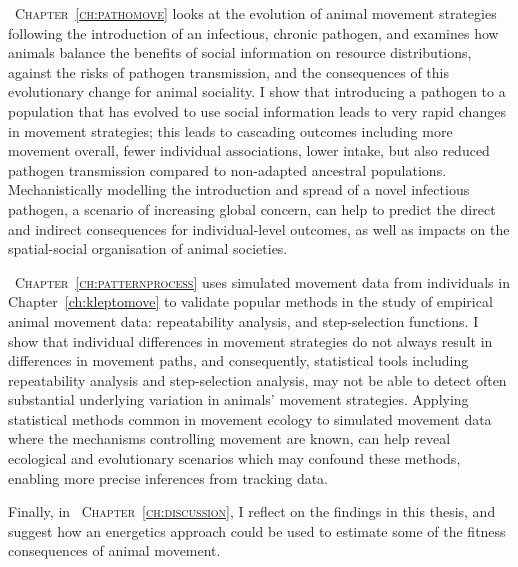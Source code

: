 \medskip

{\scshape~Chapter~\ref{ch:pathomove}} looks at the evolution of animal movement strategies following the introduction of an infectious, chronic pathogen, and examines how animals balance the benefits of social information on resource distributions, against the risks of pathogen transmission, and the consequences of this evolutionary change for animal sociality.
I show that introducing a pathogen to a population that has evolved to use social information leads to very rapid changes in movement strategies; this leads to cascading outcomes including more movement overall, fewer individual associations, lower intake, but also reduced pathogen transmission compared to non-adapted ancestral populations.
Mechanistically modelling the introduction and spread of a novel infectious pathogen, a scenario of increasing global concern, can help to predict the direct and indirect consequences for individual-level outcomes, as well as impacts on the spatial-social organisation of animal societies.

\medskip

{\scshape~Chapter~\ref{ch:patternprocess}} uses simulated movement data from individuals in Chapter~\ref{ch:kleptomove} to validate popular methods in the study of empirical animal movement data: repeatability analysis, and step-selection functions.
I show that individual differences in movement strategies do not always result in differences in movement paths, and consequently, statistical tools including repeatability analysis and step-selection analysis, may not be able to detect often substantial underlying variation in animals' movement strategies.
Applying statistical methods common in movement ecology to simulated movement data where the mechanisms controlling movement are known, can help reveal ecological and evolutionary scenarios which may confound these methods, enabling more precise inferences from tracking data.

\medskip

Finally, in {\scshape~Chapter~\ref{ch:discussion}}, I reflect on the findings in this thesis, and suggest how an energetics approach could be used to estimate some of the fitness consequences of animal movement.


\endgroup

{ \begin{center}  \end{center} }

\vfill

\cleardoublepage
